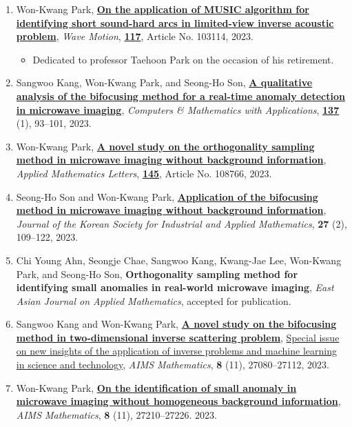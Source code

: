 \documentclass[10pt,A4]{article}
\begin{document}
\begin{enumerate}
\item\label{A-WAMOT2023} Won-Kwang Park, \href{https://doi.org/10.1016/j.wavemoti.2022.103114}{\textbf{On the application of MUSIC algorithm for identifying short sound-hard arcs in limited-view inverse acoustic problem}}, \textit{Wave Motion}, \href{https://www.sciencedirect.com/journal/wave-motion/vol/117/suppl/C}{\textbf{117}}, Article No. 103114, 2023.
\begin{itemize}
\item Dedicated to professor Taehoon Park on the occasion of his retirement.
\end{itemize}
\item\label{A-CAMWA2023} Sangwoo Kang, Won-Kwang Park, and Seong-Ho Son, \href{https://doi.org/10.1016/j.camwa.2023.02.017}{\textbf{A qualitative analysis of the bifocusing method for a real-time anomaly detection in microwave imaging}}, \textit{Computers \& Mathematics with Applications}, \href{https://www.sciencedirect.com/journal/computers-and-mathematics-with-applications/vol/137/suppl/C}{\textbf{137}} (1), 93--101, 2023.
\item\label{A-AML2023} Won-Kwang Park, \href{https://doi.org/10.1016/j.aml.2023.108766}{\textbf{A novel study on the orthogonality sampling method in microwave imaging without background information}}, \textit{Applied Mathematics Letters}, \href{https://www.sciencedirect.com/journal/applied-mathematics-letters/vol/145/suppl/C}{\textbf{145}}, Article No. 108766, 2023.
\item\label{A-KSIAM2023} Seong-Ho Son and Won-Kwang Park, \href{https://doi.org/10.12941/jksiam.2023.27.109}{\textbf{Application of the bifocusing method in microwave imaging without background information}}, \textit{Journal of the Korean Society for Industrial and Applied Mathematics}, \textbf{27} (2), 109--122, 2023.
\item\label{A-EAJAM2023} Chi Young Ahn, Seongje Chae, Sangwoo Kang, Kwang-Jae Lee, Won-Kwang Park, and Seong-Ho Son, \textbf{Orthogonality sampling method for identifying small anomalies in real-world microwave imaging}, \textit{East Asian Journal on Applied Mathematics}, accepted for publication.
\item\label{A-AIMS2023A} Sangwoo Kang and Won-Kwang Park, \href{https://doi.org/10.3934/math.20231386}{\textbf{A novel study on the bifocusing method in two-dimensional inverse scattering problem}}, \href{https://www.aimspress.com/math/article/6491/special-articles}{Special issue on new insights of the application of inverse problems and machine learning in science and technology}, \textit{AIMS Mathematics}, \textbf{8} (11), 27080--27112, 2023.
\item\label{A-AIMS2023B} Won-Kwang Park, \href{https://doi.org/10.3934/math.20231392}{\textbf{On the identification of small anomaly in microwave imaging without homogeneous background information}}, \textit{AIMS Mathematics}, \textbf{8} (11), 27210--27226. 2023.
\end{enumerate}
\end{document}
